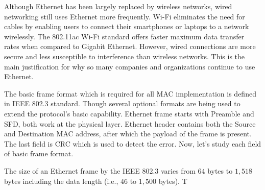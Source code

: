 \documentclass{article}
\begin{document}
Although Ethernet has been largely replaced by wireless networks,
wired networking still uses Ethernet more frequently. Wi-Fi eliminates
the need for cables by enabling users to connect their smartphones or
laptops to a network wirelessly. The 802.11ac Wi-Fi standard offers
faster maximum data transfer rates when compared to Gigabit
Ethernet. However, wired connections are more secure and less
susceptible to interference than wireless networks. This is the main
justification for why so many companies and organizations continue to
use Ethernet.

The basic frame format which is required for all MAC implementation is
defined in IEEE 802.3 standard. Though several optional formats are
being used to extend the protocol’s basic capability. Ethernet frame
starts with Preamble and SFD, both work at the physical
layer. Ethernet header contains both the Source and Destination MAC
address, after which the payload of the frame is present. The last
field is CRC which is used to detect the error. Now, let’s study each
field of basic frame format.

The size of an Ethernet frame by the IEEE 802.3 varies from $64$ bytes
to $1,518$ bytes including the data length (i.e., $46$ to $1,500$
bytes).  T
\end{document}
